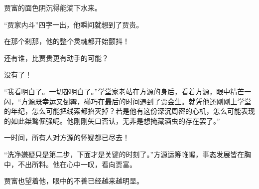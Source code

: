 \begin{this_body}
贾富的面色阴沉得能滴下水来。

“贾家内斗”四字一出，他瞬间就想到了贾贵。

在那个刹那，他的整个灵魂都开始颤抖！

还有谁，比贾贵更有动手的可能？

没有了！

“我看明白了。一切都明白了。”学堂家老站在方源的身后，看着方源，眼中精芒一闪，“方源既幸运又倒霉，碰巧在最后的时间遇到了贾金生。就凭他还刚刚上学堂的年纪，怎么可能把线索都掐灭掉？若是他有这份深沉周密的心机，怎么可能表现的如此桀骜倔强呢。他刚刚矢口否认，无非是想掩藏酒虫的存在罢了。”

一时间，所有人对方源的怀疑都已尽去！

“洗净嫌疑只是第二步，下面才是关键的时刻了。”方源运筹帷幄，事态发展皆在胸中，不出所料。他在心中一叹，看向贾富。

贾富也望着他，眼中的不善已经越来越明显。

\end{this_body}

